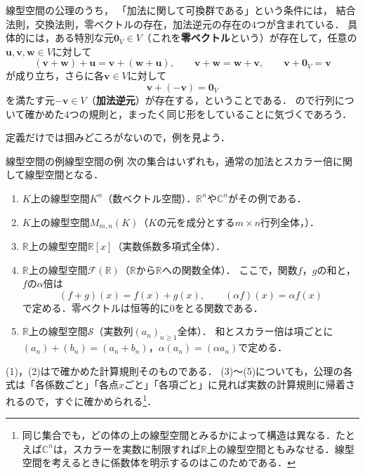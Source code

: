 \begin{remark}[加法に関する可換群の条件]
線型空間の公理のうち，
「加法に関して可換群である」という条件には，
結合法則，交換法則，零ベクトルの存在，加法逆元の存在の$4$つが含まれている．
具体的には，ある特別な元$\bm{0}_V\in V$（これを\textbf{零ベクトル}という）が存在して，任意の$\bm{u},\bm{v},\bm{w}\in V$に対して
\[
  (\bm{v}+\bm{w})+\bm{u}
  =
  \bm{v}+(\bm{w}+\bm{u}),
  \qquad
  \bm{v}+\bm{w}
  =
  \bm{w}+\bm{v},
  \qquad
  \bm{v}+\bm{0}_V
  =
  \bm{v}
\]
が成り立ち，さらに各$\bm{v}\in V$に対して
\[
  \bm{v}+(-\bm{v})
  =
  \bm{0}_V
\]
を満たす元$-\bm{v}\in V$（\textbf{加法逆元}）が存在する，ということである．
ので行列について確かめた$4$つの規則と，まったく同じ形をしていることに気づくであろう．
\end{remark}

定義だけでは掴みどころがないので，例を見よう．

\begin{example}{線型空間の例}{線型空間の例}
次の集合はいずれも，通常の加法とスカラー倍に関して線型空間となる．
\begin{enumerate}[label=(\arabic*),leftmargin=3.2em]
\item $K$上の線型空間$K^n$（数ベクトル空間）．$\mathbb{R}^n$や$\mathbb{C}^n$がその例である．
\item $K$上の線型空間$M_{m,n}(K)$（$K$の元を成分とする$m\times n$行列全体，）．
\item $\mathbb{R}$上の線型空間$\mathbb{R}[x]$（実数係数多項式全体）．
\item $\mathbb{R}$上の線型空間$\mathcal{F}(\mathbb{R})$（$\mathbb{R}$から$\mathbb{R}$への関数全体）．
  ここで，関数$f$，$g$の和と，$f$の$\alpha$倍は
  \[
    (f+g)(x)=f(x)+g(x),
    \qquad
    (\alpha f)(x)=\alpha f(x)
  \]
  で定める．零ベクトルは恒等的に$0$をとる関数である．
\item $\mathbb{R}$上の線型空間$\mathcal{S}$（実数列$(a_n)_{n\ge1}$全体）．
  和とスカラー倍は項ごとに$(a_n)+(b_n)=(a_n+b_n)$，$\alpha(a_n)=(\alpha a_n)$で定める．
\end{enumerate}
(1)，(2)はで確かめた計算規則そのものである．
(3)〜(5)についても，公理の各式は「各係数ごと」「各点$x$ごと」「各項ごと」に見れば実数の計算規則に帰着されるので，すぐに確かめられる\footnote{同じ集合でも，どの体の上の線型空間とみるかによって構造は異なる．たとえば$\mathbb{C}^n$は，スカラーを実数に制限すれば$\mathbb{R}$上の線型空間ともみなせる．線型空間を考えるときに係数体を明示するのはこのためである．}．
\end{example}

